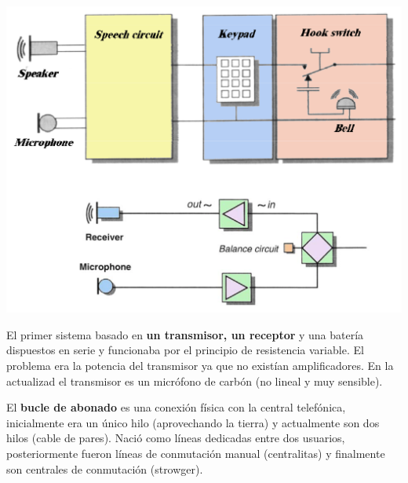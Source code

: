 \documentclass[10pt,portrait, twocolumn]{article}
\makeatletter
\renewcommand{\subsubsection}{\@startsection{subsubsection}{3}{0mm}%
                                {-1ex plus -.5ex minus -.2ex}%
                                {1ex plus .2ex}%
                                {\normalfont\small\bfseries}}
\makeatother
\begin{document}
	\begin{center}
		\includegraphics[scale=0.3]{images/TerminalTelefonico}
	\end{center}


El primer sistema basado en \textbf{un transmisor, un receptor} y una batería dispuestos en serie y funcionaba por el principio de resistencia variable. El problema era la potencia del transmisor ya que no existían amplificadores. En la actualizad el transmisor es un micrófono de carbón (no lineal y muy sensible).


El \textbf{bucle de abonado} es una conexión física con la central telefónica, inicialmente era un único hilo (aprovechando la tierra) y actualmente son dos hilos (cable de pares). Nació como líneas dedicadas entre dos usuarios, posteriormente fueron líneas de conmutación manual (centralitas) y finalmente son centrales de conmutación (strowger).

\end{document}
